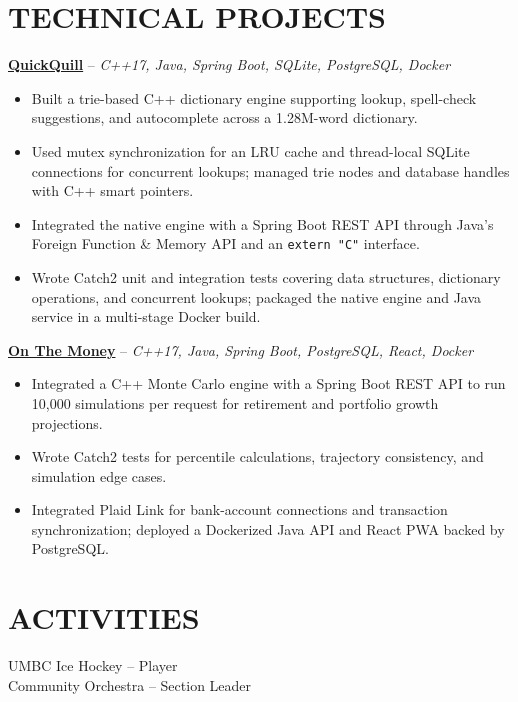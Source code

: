 \documentclass[10pt,letterpaper]{article}
\begin{document}
\section*{TECHNICAL PROJECTS}
\textbf{\href{https://github.com/nickczak/QuickQuill-Dictionary-SpellChecker}{QuickQuill}} -- \textit{C++17, Java, Spring Boot, SQLite, PostgreSQL, Docker}
\begin{itemize}
  \item Built a trie-based C++ dictionary engine supporting lookup, spell-check suggestions, and autocomplete across a 1.28M-word dictionary.
  \item Used mutex synchronization for an LRU cache and thread-local SQLite connections for concurrent lookups; managed trie nodes and database handles with C++ smart pointers.
  \item Integrated the native engine with a Spring Boot REST API through Java's Foreign Function \& Memory API and an \texttt{extern "C"} interface.
  \item Wrote Catch2 unit and integration tests covering data structures, dictionary operations, and concurrent lookups; packaged the native engine and Java service in a multi-stage Docker build.
\end{itemize}

\textbf{\href{https://github.com/nickczak/OnTheMoney-Finance-Tracker}{On The Money}} -- \textit{C++17, Java, Spring Boot, PostgreSQL, React, Docker}
\begin{itemize}
  \item Integrated a C++ Monte Carlo engine with a Spring Boot REST API to run 10,000 simulations per request for retirement and portfolio growth projections.
  \item Wrote Catch2 tests for percentile calculations, trajectory consistency, and simulation edge cases.
  \item Integrated Plaid Link for bank-account connections and transaction synchronization; deployed a Dockerized Java API and React PWA backed by PostgreSQL.
\end{itemize}
\section*{ACTIVITIES}
UMBC Ice Hockey -- Player \\
Community Orchestra -- Section Leader
\end{document}
